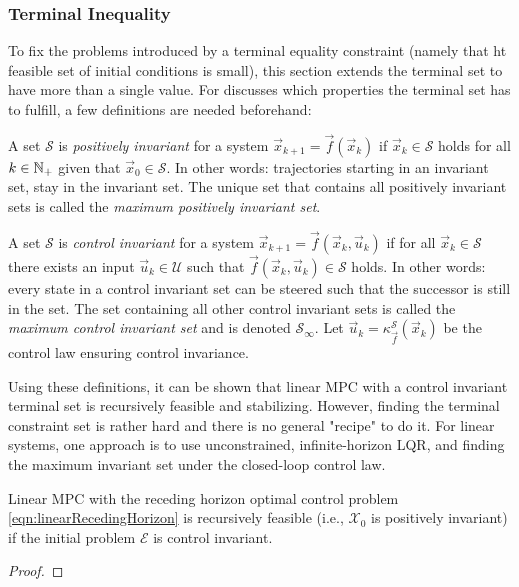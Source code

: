 			\subsubsection{Terminal Inequality}
				To fix the problems introduced by a terminal equality constraint (namely that ht feasible set of initial conditions is small), this section extends the terminal set to have more than a single value. For discusses which properties the terminal set has to fulfill, a few definitions are needed beforehand:
				\begin{definition}
					A set \(\mathcal{S}\) is \emph{positively invariant} for a system \( \vec{x}_{k + 1} = \vec{f}(\vec{x}_k) \) if \( \vec{x}_k \in \mathcal{S} \) holds for all \( k \in \mathbb{N}_+ \) given that \( \vec{x}_0 \in \mathcal{S} \). In other words: trajectories starting in an invariant set, stay in the invariant set. The unique set that contains all positively invariant sets is called the \emph{maximum positively invariant set}.
				\end{definition}
				\begin{definition}
					A set \(\mathcal{S}\) is \emph{control invariant} for a system \( \vec{x}_{k + 1} = \vec{f}(\vec{x}_k, \vec{u}_k) \) if for all \( \vec{x}_k \in \mathcal{S} \) there exists an input \( \vec{u}_k \in \mathcal{U} \) such that \( \vec{f}(\vec{x}_k, \vec{u}_k) \in \mathcal{S} \) holds. In other words: every state in a control invariant set can be steered such that the successor is still in the set. The set containing all other control invariant sets is called the \emph{maximum control invariant set} and is denoted \(\mathcal{S}_\infty\). Let \( \vec{u}_k = \kappa_{\vec{f}}^{\mathcal{S}}(\vec{x}_k) \) be the control law ensuring control invariance.
				\end{definition}

				Using these definitions, it can be shown that linear MPC with a control invariant terminal set is recursively feasible and stabilizing. However, finding the terminal constraint set is rather hard and there is no general "recipe" to do it. For linear systems, one approach is to use unconstrained, infinite-horizon LQR, and finding the maximum invariant set under the closed-loop control law.

				\begin{theorem}
					Linear MPC with the receding horizon optimal control problem \eqref{eqn:linearRecedingHorizon} is recursively feasible (i.e., \(\mathcal{X}_0\) is positively invariant) if the initial problem \(\mathcal{E}\) is control invariant.
				\end{theorem}
				\begin{proof}
				\end{proof}


